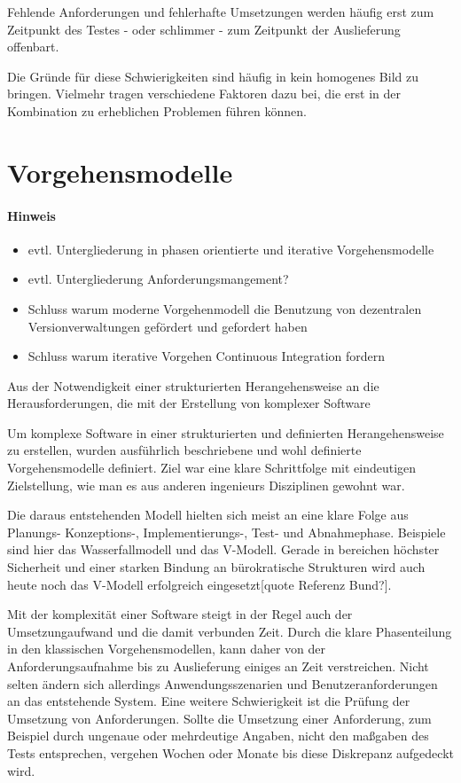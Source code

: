 \documentclass[12pt,a4paper]{book}
\begin{document}
Fehlende Anforderungen und fehlerhafte Umsetzungen werden häufig erst zum Zeitpunkt des Testes - oder schlimmer - zum Zeitpunkt der Auslieferung offenbart.

Die Gründe für diese Schwierigkeiten sind häufig in kein homogenes Bild zu bringen. Vielmehr tragen verschiedene Faktoren dazu bei, die erst in der Kombination zu erheblichen Problemen führen können.

\section{Vorgehensmodelle}
\paragraph{Hinweis}

\begin{itemize}
\item evtl. Untergliederung in phasen orientierte und iterative Vorgehensmodelle
\item  evtl. Untergliederung Anforderungsmangement?
\item Schluss warum moderne Vorgehenmodell die Benutzung von dezentralen Versionverwaltungen gefördert und gefordert haben
\item Schluss warum iterative Vorgehen Continuous Integration fordern
\end{itemize}

\vspace{1em}

Aus der Notwendigkeit einer strukturierten Herangehensweise an die Herausforderungen, die mit der Erstellung von komplexer Software

Um komplexe Software in einer strukturierten und definierten Herangehensweise zu erstellen, wurden ausführlich beschriebene und wohl definierte Vorgehensmodelle definiert. Ziel war eine klare Schrittfolge mit eindeutigen Zielstellung, wie man es aus anderen ingenieurs Disziplinen gewohnt war. 

Die daraus entstehenden Modell hielten sich meist an eine klare Folge aus Planungs- Konzeptions-, Implementierungs-, Test- und Abnahmephase. Beispiele sind hier das Wasserfallmodell und das V-Modell. Gerade in bereichen höchster Sicherheit und einer starken Bindung an bürokratische Strukturen wird auch heute noch das V-Modell erfolgreich eingesetzt[quote Referenz Bund?].

Mit der komplexität einer Software steigt in der Regel auch der Umsetzungaufwand und die damit verbunden Zeit. Durch die klare Phasenteilung in den klassischen Vorgehensmodellen, kann daher von der Anforderungsaufnahme bis zu Auslieferung einiges an Zeit verstreichen. Nicht selten ändern sich allerdings Anwendungsszenarien und Benutzeranforderungen an das entstehende System. Eine weitere Schwierigkeit ist die Prüfung der Umsetzung von Anforderungen. Sollte die Umsetzung einer Anforderung, zum Beispiel durch ungenaue oder mehrdeutige Angaben, nicht den maßgaben des Tests entsprechen, vergehen Wochen oder Monate bis diese Diskrepanz aufgedeckt wird.
\end{document}
